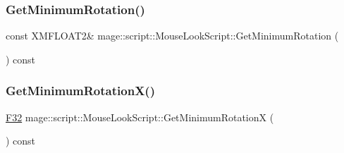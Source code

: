 \hypertarget{classmage_1_1script_1_1_mouse_look_script_a0e2fb755d8972814f6823a6d5e4507f4}{}\label{classmage_1_1script_1_1_mouse_look_script_a0e2fb755d8972814f6823a6d5e4507f4} 
\subsubsection{\texorpdfstring{Get\+Minimum\+Rotation()}{GetMinimumRotation()}}
{\footnotesize\ttfamily const X\+M\+F\+L\+O\+A\+T2\& mage\+::script\+::\+Mouse\+Look\+Script\+::\+Get\+Minimum\+Rotation (\begin{DoxyParamCaption}{ }\end{DoxyParamCaption}) const\hspace{0.3cm}{\ttfamily [noexcept]}}

\hypertarget{classmage_1_1script_1_1_mouse_look_script_ae594a42302f9ccd47e08070759c3ccf7}{}\label{classmage_1_1script_1_1_mouse_look_script_ae594a42302f9ccd47e08070759c3ccf7} 
\subsubsection{\texorpdfstring{Get\+Minimum\+Rotation\+X()}{GetMinimumRotationX()}}
{\footnotesize\ttfamily \hyperlink{namespacemage_aa97e833b45f06d60a0a9c4fc22ae02c0}{F32} mage\+::script\+::\+Mouse\+Look\+Script\+::\+Get\+Minimum\+RotationX (\begin{DoxyParamCaption}{ }\end{DoxyParamCaption}) const\hspace{0.3cm}{\ttfamily [noexcept]}}

\hypertarget{classmage_1_1script_1_1_mouse_look_script_a8faf82867207fb604f7155b8dbadfdb0}{}\label{classmage_1_1script_1_1_mouse_look_script_a8faf82867207fb604f7155b8dbadfdb0} 
